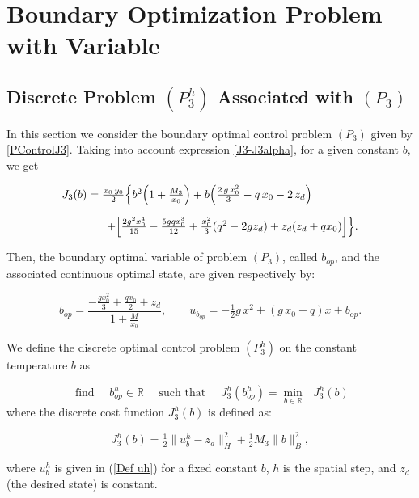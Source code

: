 \documentclass[11pt]{article}
\begin{document}
\section{Boundary Optimization Problem with Variable }\label{sec5}%

\subsection{Discrete Problem  ${(P^h_{3})}$ Associated with $(P_3)$} %
In this section we consider the boundary optimal control problem  $(P_3)$ given by \eqref{PControlJ3}. 
Taking into account expression \eqref{J3-J3alpha}, for a given constant $b$, we get
    
    \begin{equation}\label{J3-explicito}
    \begin{array}{ll}
     J_3(b)=\tfrac{x_0\,y_0}{2}\Big\{ b^2 \Big(1+ \tfrac{M_3}{x_0} \Big) + b   \Big( \tfrac{2\,g\,x_0^2 }{3}- q\,x_0 - 2\,z_d \Big) \\[0.45cm]
     \hspace{1.4cm}+\Big [\tfrac{2g^2 x_0^4}{15} -\tfrac{5 g q x_0^3}{12} + \tfrac{x_0^2}{3} (q^2-2 g z_d) + z_d(z_d + q x_0) \Big]\Big\}.
     \end{array} 
    \end{equation}

    \noindent Then, the boundary optimal variable of problem $(P_3)$, called $b_{op}$, and the associated continuous optimal state, are given respectively by:
    
    \begin{equation}\label{bop-ubop}
     b_{op}= \frac{-\tfrac{g x_0^2}{3} + \tfrac{q x_0}{2} + z_d}{1+ \tfrac{M}{x_0}}, \qquad 
     u_{b_{op}}=  -\tfrac{1}{2} g\, x^2 + (g\, x_0 - q) x +b_{op}.
    \end{equation}


We define the discrete optimal control problem ${(P^h_{3})}$ on the constant temperature $b$ as

$$ \text{ find }\quad {b^h_{op}}\in \mathbb{R}\quad\text{ such that }\quad
{J^h_{3}}({b^h_{op}})=\min\limits_{b\in \mathbb{R}} \text{ }{J^h_{3}}(b)
$$
where the discrete cost function  ${J^h_{3}}(b)$ is defined as:
    
     \[{J^h_{3}} (b)=  \tfrac{1}{2} \lVert {u^h_b} - z_d \rVert^2_H +  \tfrac{1}{2} M_3 \lVert b \rVert ^2_B, \]
     
 \noindent where ${u^h_b}$ is given in (\ref{Def uh}) {for a fixed constant $b$}, $h$ is the spatial step, and $z_d$ (the desired state) is constant.
 
\end{document}
